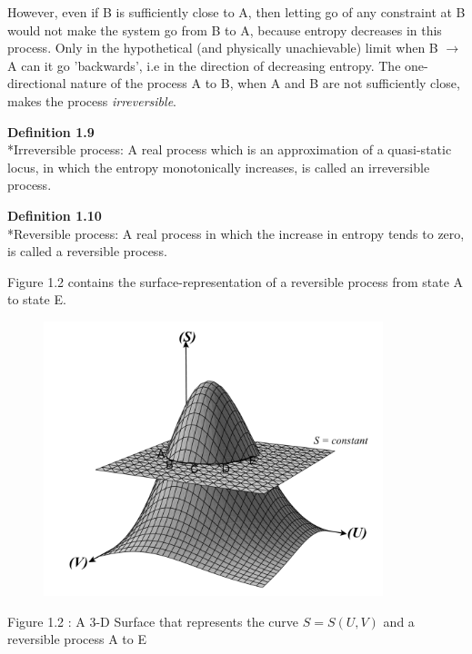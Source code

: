 \documentclass[oneside]{book}
\begin{document}
However, even if B is sufficiently close to A, then letting go of any constraint at B would not make the system go from B to A, because entropy decreases in this process. Only in the hypothetical (and physically unachievable) limit when B $\rightarrow$ A can it go 'backwards', i.e in the direction of decreasing entropy. The one-directional nature of the process A to B, when A and B are not sufficiently close, makes the process \emph{irreversible}.

\begin{mdframed}[style=exercise]
\textbf{Definition 1.9}
 \\*Irreversible process: A real process which is an approximation of a quasi-static locus, in which the entropy monotonically increases, is called an irreversible process. \\ 
\end{mdframed}

\begin{mdframed}[style=exercise]
\textbf{Definition 1.10}
 \\*Reversible process: A real process in which the increase in entropy tends to zero, is called a reversible process. \\ 
\end{mdframed}

Figure 1.2 contains the surface-representation of a reversible process from state A to state E.\\

\begin{center}
\includegraphics[width = 12cm, height = 8cm]{Curve2}
\end{center}
\begin{center}
Figure 1.2 : A 3-D Surface that represents the curve $S = S(U,V)$ and a reversible process A to E 
\end{center}
\end{document}
